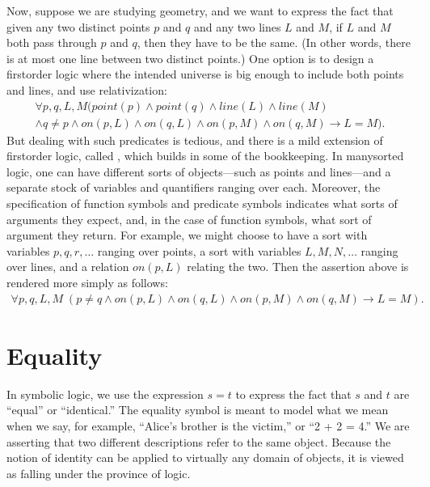 \documentclass[letterpaper,10pt,english]{sphinxmanual}
\begin{document}
\sphinxAtStartPar
Now, suppose we are studying geometry, and we want to express the fact that given any two distinct points \(p\) and \(q\) and any two lines \(L\) and \(M\), if \(L\) and \(M\) both pass through \(p\) and \(q\), then they have to be the same. (In other words, there is at most one line between two distinct points.) One option is to design a first\sphinxhyphen{}order logic where the intended universe is big enough to include both points and lines, and use relativization:
\begin{equation*}
\begin{split}\forall {p, q, L, M} (\mathit{point}(p) \wedge \mathit{point}(q) \wedge
\mathit{line}(L) \wedge \mathit{line}(M) \\
\wedge q \neq p \wedge \mathit{on}(p,L) \wedge \mathit{on}(q,L) \wedge \mathit{on}(p,M) \wedge
\mathit{on}(q,M) \to L = M).\end{split}
\end{equation*}
\sphinxAtStartPar
But dealing with such predicates is tedious, and there is a mild extension of first\sphinxhyphen{}order logic, called , which builds in some of the bookkeeping. In many\sphinxhyphen{}sorted logic, one can have different sorts of objects—such as points and lines—and a separate stock of variables and quantifiers ranging over each. Moreover, the specification of function symbols and predicate symbols indicates what sorts of arguments they expect, and, in the case of function symbols, what sort of argument they return. For example, we might choose to have a sort with variables \(p, q, r, \ldots\) ranging over points, a sort with variables \(L, M, N, \ldots\) ranging over lines, and a relation \(\mathit{on}(p, L)\) relating the two. Then the assertion above is rendered more simply as follows:
\begin{equation*}
\begin{split}\forall {p, q, L, M} \; (p \neq q \wedge \mathit{on}(p,L) \wedge \mathit{on}(q,L) \wedge \mathit{on}(p,M) \wedge \mathit{on}(q,M) \to L = M).\end{split}
\end{equation*}

\section{Equality}
\label{\detokenize{first_order_logic:equality}}
\sphinxAtStartPar
In symbolic logic, we use the expression \(s = t\) to express the fact that \(s\) and \(t\) are “equal” or “identical.” The equality symbol is meant to model what we mean when we say, for example, “Alice’s brother is the victim,” or “2 + 2 = 4.” We are asserting that two different descriptions refer to the same object. Because the notion of identity can be applied to virtually any domain of objects, it is viewed as falling under the province of logic.
\end{document}
